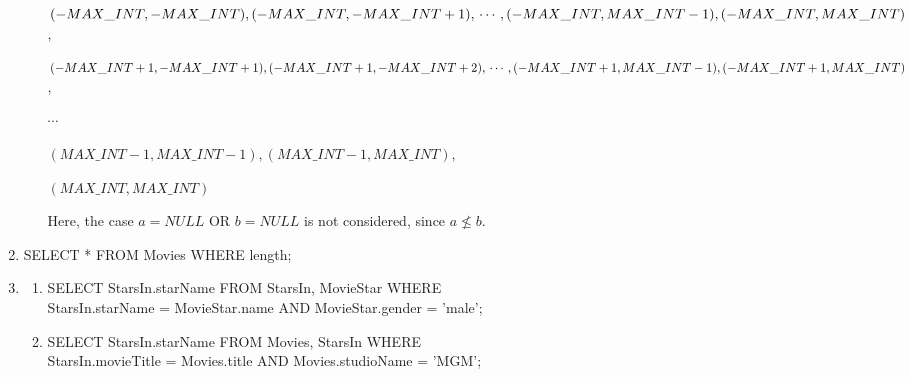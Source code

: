 \documentclass[12pt]{article}
\begin{document}
\begin{enumerate}[1.]
\begin{enumerate}[a)]
        \bigskip

        $(-MAX\_INT, -MAX\_INT), (-MAX\_INT,-MAX\_INT + 1), \\
        \cdots, (-MAX\_INT,MAX\_INT - 1),\\
        (-MAX\_INT,MAX\_INT)$,

        \bigskip

        $(-MAX\_INT + 1, -MAX\_INT + 1), (-MAX\_INT + 1,-MAX\_INT + 2), \\
        \cdots, (-MAX\_INT + 1,MAX\_INT - 1),\\
        (-MAX\_INT + 1,MAX\_INT)$,

        \bigskip

        $\cdots$

        \bigskip

        $(MAX\_INT - 1, MAX\_INT - 1), (MAX\_INT - 1,MAX\_INT)$,

        \bigskip

        $(MAX\_INT, MAX\_INT)$

        \bigskip

        Here, the case $a = NULL$ OR $b = NULL$ is not considered, since $a \nleq b$.
    \end{enumerate}

    \item

    SELECT * FROM Movies WHERE length;

    \item

    \begin{enumerate}
        \item SELECT StarsIn.starName FROM StarsIn, MovieStar WHERE \\
        StarsIn.starName = MovieStar.name AND MovieStar.gender = 'male';

        \item SELECT StarsIn.starName FROM Movies, StarsIn WHERE \\
        StarsIn.movieTitle = Movies.title AND Movies.studioName = 'MGM';
    \end{enumerate}
\end{enumerate}
\end{document}
